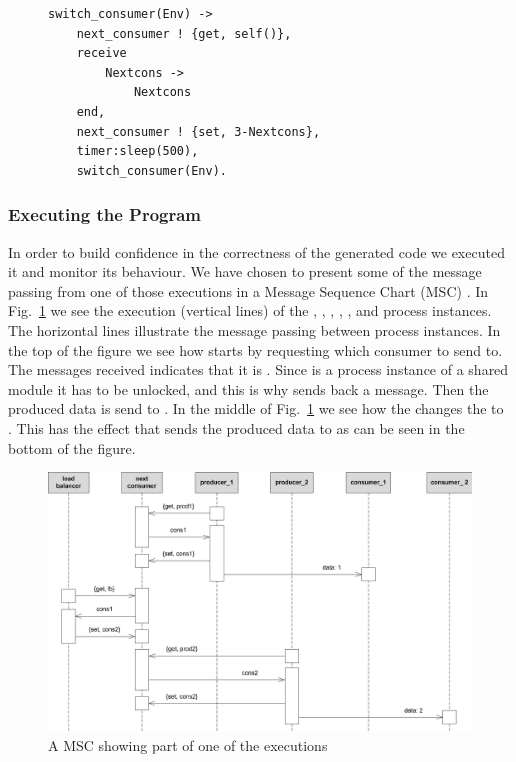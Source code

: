 \begin{figure}[b!]
\begin{verbatim}
switch_consumer(Env) -> 
    next_consumer ! {get, self()},
    receive 
        Nextcons -> 
            Nextcons
    end,
    next_consumer ! {set, 3-Nextcons},
    timer:sleep(500),
    switch_consumer(Env).
\end{verbatim}
\end{figure}




\subsubsection{Executing the Program}
In order to build confidence in the correctness of the generated code we executed it and monitor its behaviour. We have chosen to present some of the message passing from one of those executions in a Message Sequence Chart (MSC) \cite{MSC}. In Fig.~\ref{fig:msc} we see the execution (vertical lines) of the , , , , , and  process instances. The horizontal lines illustrate the message passing between process instances. In the top of the figure we see how  starts by requesting which consumer to send to. The messages received indicates that it is . Since  is a process instance of a shared module it has to be unlocked, and this is why  sends back  a message. Then the produced data is send to . In the middle of Fig.~\ref{fig:msc} we see how the  changes the  to . This has the effect that  sends the produced data to  as can be seen in the bottom of the figure.

\begin{figure}[b!]
\centering
\includegraphics[width=\textwidth]{techniques_and_tool/experiments/graphics/msc.eps}
\caption{A MSC showing part of one of the executions}
\label{fig:msc}
\end{figure}

